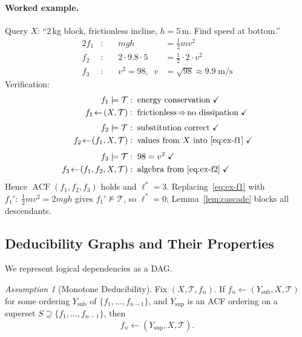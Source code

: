 \documentclass{uai2026} %
\theoremstyle{remark}
\newtheorem{assumption}{Assumption}
\theoremstyle{plain}
\theoremstyle{definition}
\begin{document}
\paragraph{Worked example.}
Query $X$: ``$2\,$kg block, frictionless incline,
$h=5\,$m.  Find speed at bottom.''
\begin{alignat}{2}
  f_{1}&: &\quad mgh &= \tfrac{1}{2}mv^{2}
  \label{eq:ex-f1}\\[2pt]
  f_{2}&: &\quad 2\!\cdot\!9.8\!\cdot\!5
  &= \tfrac{1}{2}\!\cdot\!2\!\cdot\!v^{2}
  \label{eq:ex-f2}\\[2pt]
  f_{3}&: &\quad v^{2}=98,\;\;
  v&=\sqrt{98}\approx 9.9\;\text{m/s}
  \label{eq:ex-f3}
\end{alignat}
Verification:
\begin{align}
  f_{1}\models\mathcal{T}&:\;
  \text{energy conservation}
  \;\checkmark
  \nonumber\\
  f_{1}\!\leftarrow\!(X,\mathcal{T})&:\;
  \text{frictionless}\!\Rightarrow\!\text{no dissipation}
  \;\checkmark
  \label{eq:ex-check1}\\[3pt]
  f_{2}\models\mathcal{T}&:\;
  \text{substitution correct}
  \;\checkmark
  \nonumber\\
  f_{2}\!\leftarrow\!(f_{1},X,\mathcal{T})&:\;
  \text{values from }X\text{ into }
  \eqref{eq:ex-f1}
  \;\checkmark
  \label{eq:ex-check2}\\[3pt]
  f_{3}\models\mathcal{T}&:\;
  98=v^{2}\;\checkmark
  \nonumber\\
  f_{3}\!\leftarrow\!(f_{1},f_{2},X,\mathcal{T})&:\;
  \text{algebra from }\eqref{eq:ex-f2}
  \;\checkmark
  \label{eq:ex-check3}
\end{align}
Hence $\operatorname{ACF}(f_{1},f_{2},f_{3})$ holds
and $\ell^{*}=3$.
Replacing~\eqref{eq:ex-f1} with
$f_{1}':\;\tfrac{1}{2}mv^{2}=2mgh$ gives
$f_{1}'\not\models\mathcal{T}$, so $\ell^{*}=0$;
Lemma~\ref{lem:cascade} blocks all descendants.

\subsection{Deducibility Graphs and Their Properties}

We represent logical dependencies as a DAG.

\begin{assumption}[Monotone Deducibility]
\label{ass:superstring}
Fix $(X,\mathcal{T},f_{n})$.  If
$f_{n}\!\leftarrow\!(Y_{\mathrm{sub}},X,\mathcal{T})$
for some ordering $Y_{\mathrm{sub}}$ of
$\{f_{1},\dots,f_{n-1}\}$, and $Y_{\mathrm{sup}}$ is an
ACF ordering on a superset
$S\supseteq\{f_{1},\dots,f_{n-1}\}$, then
\begin{equation}\label{eq:monotone}
  f_{n}\!\leftarrow\!
  (Y_{\mathrm{sup}},X,\mathcal{T}).
\end{equation}
\end{assumption}
\end{document}
